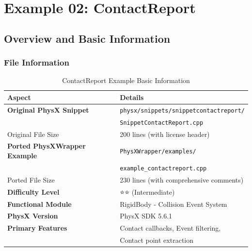 
\section{Example 02: ContactReport}

\subsection{Overview and Basic Information}

\subsubsection{File Information}

\begin{table}[h]
\centering
\begin{tabular}{|l|l|}
\hline
\textbf{Aspect} & \textbf{Details} \\
\hline
\textbf{Original PhysX Snippet} & \texttt{physx/snippets/snippetcontactreport/} \\
 & \texttt{SnippetContactReport.cpp} \\
\hline
Original File Size & 200 lines (with license header) \\
\hline
\textbf{Ported PhysXWrapper Example} & \texttt{PhysXWrapper/examples/} \\
 & \texttt{example\_contactreport.cpp} \\
\hline
Ported File Size & 230 lines (with comprehensive comments) \\
\hline
\textbf{Difficulty Level} & ⭐⭐ (Intermediate) \\
\hline
\textbf{Functional Module} & RigidBody - Collision Event System \\
\hline
\textbf{PhysX Version} & PhysX SDK 5.6.1 \\
\hline
\textbf{Primary Features} & Contact callbacks, Event filtering, \\
 & Contact point extraction \\
\hline
\end{tabular}
\caption{ContactReport Example Basic Information}
\end{table}

